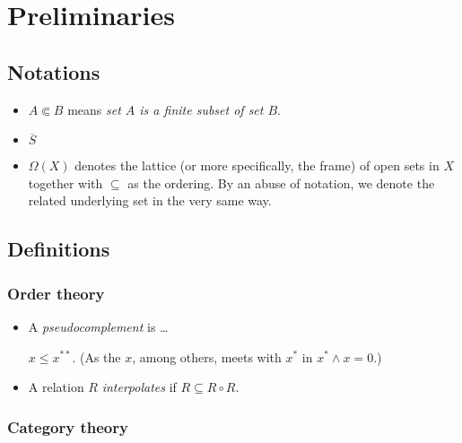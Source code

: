 \chapter*{Preliminaries}

\section*{Notations}

\begin{itemize}
\item $A \Subset B$ means {\sl set $A$ is a finite subset of set $B$\/}.
\item $\overline{S}$ 
\item $\Omega(X)$ denotes the lattice (or more specifically, the frame) of open
sets in $X$ together with $\subseteq$ as the ordering. 
By an abuse of notation, we denote the related underlying set in the very same
way.
\end{itemize}

\section*{Definitions}

\subsection*{Order theory}

\begin{itemize}
\item A \emph{pseudocomplement} is \ldots
  \begin{fact}
    $x \le x^{**}$.
    (As the $x$, among others, meets with $x^*$ in $x^* \wedge x = 0$.)
  \end{fact}
\item A relation $R$ \emph{interpolates} if $R \subseteq R \circ R$.
\end{itemize}

\subsection*{Category theory}

